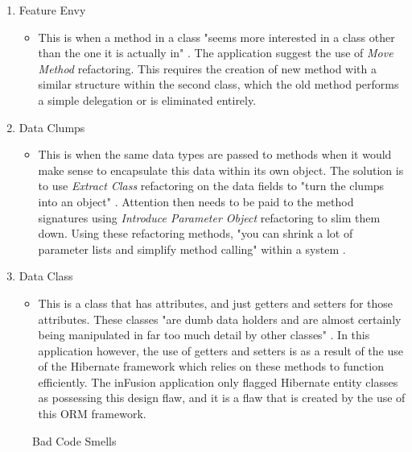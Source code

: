 \begin{enumerate}
\begin{itemize}
\end{itemize}
\item Feature Envy
\begin{itemize}
\item This is when a method in a class "seems more interested in a class other than the one it is actually in" \parencite{beck1999bad}. The application suggest the use of \textit{Move Method} refactoring. This requires the creation of new method with a similar structure within the second class, which the old method performs a simple delegation or is eliminated entirely.
\end{itemize}
\item Data Clumps
\begin{itemize}
\item This is when the same data types are passed to methods when it would make sense to encapsulate this data within its own object. The solution is to use \textit{Extract Class} refactoring on the data fields to "turn the clumps into an object" \parencite{beck1999bad}. Attention then needs to be paid to the method signatures using \textit{Introduce Parameter Object} refactoring to slim them down. Using these refactoring methods, "you can shrink a lot of parameter lists and simplify method calling" within a system \parencite{beck1999bad}.
\end{itemize}
\item Data Class
\begin{itemize}
\item This is a class that has attributes, and just getters and setters for those attributes. These classes "are dumb data holders and are almost certainly being manipulated in far too much detail by other classes" \parencite{beck1999bad}. In this application however, the use of getters and setters is as a result of the use of the Hibernate framework which relies on these methods to function efficiently. The inFusion application only flagged Hibernate entity classes as possessing this design flaw, and it is a flaw that is created by the use of this ORM framework. 
\end{itemize}
\end{enumerate}
\begin{figure}[h]
\caption{Bad Code Smells}
\label{fig:badcodesmells}
\end{figure}


